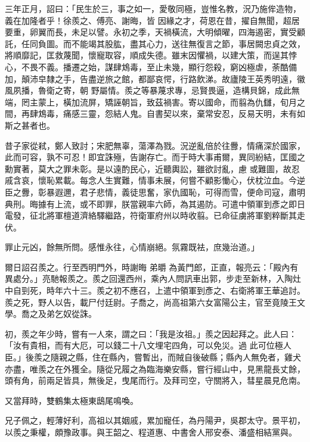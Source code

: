 \begin{pinyinscope}
 三年正月，詔曰：「民生於三，事之如一，愛敬同極，豈惟名教，況乃施侔造物，義在加隆者乎！徐羨之、傅亮、謝晦，皆
 因緣之才，荷恩在昔，擢自無聞，超居要重，卵翼而長，未足以譬。永初之季，天禍橫流，大明傾曜，四海遏密，實受顧託，任同負圖。而不能竭其股肱，盡其心力，送往無復言之節，事居闕忠貞之效，將順靡記，匡救蔑聞，懷寵取容，順成失德。雖末因懼禍，以建大策，而逞其悖心，不畏不義。播遷之始，謀肆鴆毒，至止未幾，顯行怨殺，窮凶極虐，荼酷備加，顛沛皁隸之手，告盡逆旅之館，都鄙哀愕，行路飲涕。故廬陵王英秀明遠，徽風夙播，魯衛之寄，朝
 野屬情。羨之等暴蔑求專，忌賢畏逼，造構貝錦，成此無端，罔主蒙上，橫加流屏，矯誣朝旨，致茲禍害。寄以國命，而翦為仇讎，旬月之間，再肆鴆毒，痛感三靈，怨結人鬼。自書契以來，棄常安忍，反易天明，未有如斯之甚者也。



 昔子家從弒，鄭人致討；宋肥無辜，蕩澤為戮。況逆亂倍於往釁，情痛深於國家，此而可容，孰不可忍！即宜誅殛，告謝存亡。而于時大事甫爾，異同紛結，匡國之勳實著，莫大之罪未彰。是以遠酌民心，近聽輿訟，雖欲討亂，慮
 或難圖，故忍戚含哀，懷恥累載。每念人生實難，情事未展，何嘗不顧影慟心，伏枕泣血。今逆臣之釁，彰暴遐邇，君子悲情，義徒思奮，家仇國恥，可得而雪，便命司寇，肅明典刑。晦據有上流，或不即罪，朕當親率六師，為其遏防。可遣中領軍到彥之即日電發，征北將軍檀道濟絡驛繼路，符衛軍府州以時收翦。已命征虜將軍劉粹斷其走伏。



 罪止元凶，餘無所問。感惟永往，心情崩絕。氛霧既袪，庶幾治道。」


爾日詔召羨之。行至西明門外，時謝晦
 弟㬭
 為黃門郎，正直，報亮云：「殿內有異處分。」亮馳報羨之。羨之回還西州，乘內人問訊車出郭，步走至新林，入陶灶中自剄死，時年六十三。羨之初不應召，上遣中領軍到彥之、右衛將軍王華追討。羨之死，野人以告，載尸付廷尉。子喬之，尚高祖第六女富陽公主，官至竟陵王文學。喬之及弟乞奴從誅。



 初，羨之年少時，嘗有一人來，謂之曰：「我是汝祖。」羨之因起拜之。此人曰：「汝有貴相，而有大厄，可以錢二十八文埋宅四角，可以免災。過
 此可位極人臣。」後羨之隨親之縣，住在縣內，嘗暫出，而賊自後破縣；縣內人無免者，雞犬亦盡，唯羨之在外獲全。隨從兄履之為臨海樂安縣，嘗行經山中，見黑龍長丈餘，頭有角，前兩足皆具，無後足，曳尾而行。及拜司空，守關將入，彗星晨見危南。



 又當拜時，雙鶴集太極東鴟尾鳴喚。



 兄子佩之，輕薄好利，高祖以其姻戚，累加寵任，為丹陽尹，吳郡太守。景平初，以羨之秉權，頗豫政事。與王韶之、程道惠、中書舍人邢安泰、潘盛相結黨與。




\end{pinyinscope}
